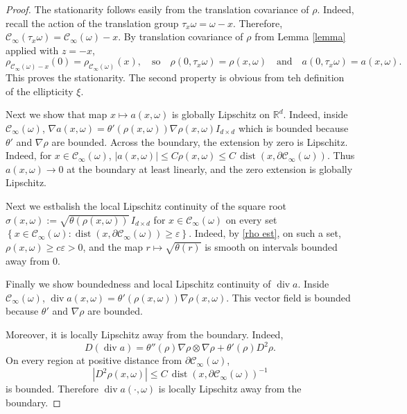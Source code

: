 \documentclass[11pt]{article}
\theoremstyle{rem}
\begin{document}
\begin{proof} 
The stationarity follows easily from the translation covariance of $\rho$. Indeed, recall the action of 
the translation group $\tau_x\omega=\omega-x$. Therefore,
$\mathcal C_\infty(\tau_x\omega)
=\mathcal C_\infty(\omega)-x$. 
By translation covariance of $\rho$ from Lemma \ref{lemma} applied with $z=-x$,
$$\rho_{\mathcal C_\infty(\omega)-x}(0)
=
\rho_{\mathcal C_\infty(\omega)}(x), \quad\mbox{so}\quad \rho(0,\tau_x\omega)=\rho(x,\omega) \quad\mbox{and}\quad a(0,\tau_x\omega)=a(x,\omega). 
$$
This proves the stationarity. The second property is obvious from teh definition of the ellipticity $\xi$.

Next we show that map $x\mapsto a(x,\omega)$ is globally Lipschitz on $\mathbb R^d$.
Indeed, inside $\mathcal C_\infty(\omega)$,
$\nabla a(x,\omega)
=\theta'(\rho(x,\omega))\nabla\rho(x,\omega) I_{d\times d}$ 
which is bounded because $\theta'$ and $\nabla\rho$ are bounded.
Across the boundary, the extension by zero is Lipschitz. Indeed, for $x\in\mathcal C_\infty(\omega)$,
$|a(x,\omega)|
\le C \rho(x,\omega)
\le C\,\operatorname{dist}(x,\partial\mathcal C_\infty(\omega))$. 
Thus $a(x,\omega)\to 0$ at the boundary at least linearly, and the zero extension is globally Lipschitz.

Next we estbalish the local Lipschitz continuity of the square root 
$\sigma(x,\omega):=\sqrt{\theta(\rho(x,\omega))}\,I_{d\times d}$
for $x\in\mathcal C_\infty(\omega)$ on every set
$\left\{
x\in\mathcal C_\infty(\omega):
\operatorname{dist}(x,\partial\mathcal C_\infty(\omega))\ge \varepsilon
\right\}$. Indeed, by \eqref{rho est}, on such a set,
$\rho(x,\omega)\ge c\varepsilon>0$, and the map $r\mapsto \sqrt{\theta(r)}$ is smooth on intervals bounded away from $0$. 

Finally we show boundedness and local Lipschitz continuity of $\operatorname{div}a$. 
Inside $\mathcal C_\infty(\omega)$, $\operatorname{div}a(x,\omega)=
\theta'(\rho(x,\omega))\nabla\rho(x,\omega)$. This vector field is bounded because $\theta'$ and $\nabla\rho$ are bounded.

Moreover, it is locally Lipschitz away from the boundary. Indeed,
$$
D(\operatorname{div}a)
=
\theta''(\rho)\nabla\rho\otimes\nabla\rho
+
\theta'(\rho)D^2\rho.
$$
On every region at positive distance from $\partial\mathcal C_\infty(\omega)$,
$$
|D^2\rho(x,\omega)|
\le
C\,\operatorname{dist}(x,\partial\mathcal C_\infty(\omega))^{-1}
$$
is bounded. Therefore $\operatorname{div}a(\cdot,\omega)$ is locally Lipschitz away from the boundary.
\end{proof}
\end{document}
